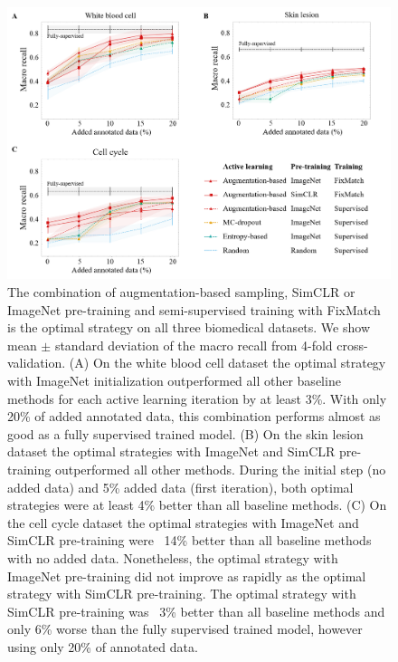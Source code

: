 \begin{figure}[htbp]
\centering
\captionsetup{format=plain}
\includegraphics[width=\textwidth]{figures/fig_results_2.png}
\caption{The combination of augmentation-based sampling, SimCLR or ImageNet pre-training and semi-supervised training with FixMatch is the optimal strategy on all three biomedical datasets. We show mean $\pm$ standard deviation of the macro recall from 4-fold cross-validation. (A) On the white blood cell dataset the optimal strategy with ImageNet initialization outperformed all other baseline methods for each active learning iteration by at least 3\%. With only 20\% of added annotated data, this combination performs almost as good as a fully supervised trained model. (B) On the skin lesion dataset the optimal strategies with ImageNet and SimCLR pre-training outperformed all other methods. During the initial step (no added data) and 5\% added data (first iteration), both optimal strategies were at least 4\% better than all baseline methods. (C) On the cell cycle dataset the optimal strategies with ImageNet and SimCLR pre-training were ~14\% better than all baseline methods with no added data. Nonetheless, the optimal strategy with ImageNet pre-training did not improve as rapidly as the optimal strategy with SimCLR pre-training. The optimal strategy with SimCLR pre-training was ~3\% better than all baseline methods and only 6\% worse than the fully supervised trained model, however using only 20\% of annotated data.}
\label{fig:results_2}
\end{figure}

\newpage

